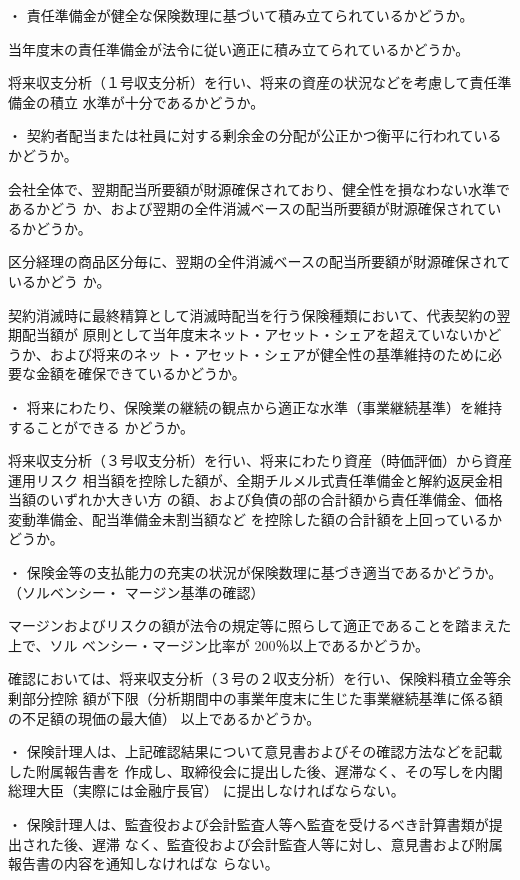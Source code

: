 \documentclass[report,gutter=10mm,fore-edge=10mm,uplatex,dvipdfmx]{jlreq}
\begin{document}
・ 責任準備金が健全な保険数理に基づいて積み立てられているかどうか。

当年度末の責任準備金が法令に従い適正に積み立てられているかどうか。

将来収支分析（１号収支分析）を行い、将来の資産の状況などを考慮して責任準備金の積立
水準が十分であるかどうか。

・ 契約者配当または社員に対する剰余金の分配が公正かつ衡平に行われているかどうか。

会社全体で、翌期配当所要額が財源確保されており、健全性を損なわない水準であるかどう
か、および翌期の全件消滅ベースの配当所要額が財源確保されているかどうか。

区分経理の商品区分毎に、翌期の全件消滅ベースの配当所要額が財源確保されているかどう
か。

契約消滅時に最終精算として消滅時配当を行う保険種類において、代表契約の翌期配当額が
原則として当年度末ネット・アセット・シェアを超えていないかどうか、および将来のネッ
ト・アセット・シェアが健全性の基準維持のために必要な金額を確保できているかどうか。

・ 将来にわたり、保険業の継続の観点から適正な水準（事業継続基準）を維持することができる
かどうか。

将来収支分析（３号収支分析）を行い、将来にわたり資産（時価評価）から資産運用リスク
相当額を控除した額が、全期チルメル式責任準備金と解約返戻金相当額のいずれか大きい方
の額、および負債の部の合計額から責任準備金、価格変動準備金、配当準備金未割当額など
を控除した額の合計額を上回っているかどうか。

・ 保険金等の支払能力の充実の状況が保険数理に基づき適当であるかどうか。（ソルベンシー・
マージン基準の確認）

マージンおよびリスクの額が法令の規定等に照らして適正であることを踏まえた上で、ソル
ベンシー・マージン比率が 200％以上であるかどうか。

確認においては、将来収支分析（３号の２収支分析）を行い、保険料積立金等余剰部分控除
額が下限（分析期間中の事業年度末に生じた事業継続基準に係る額の不足額の現価の最大値）
以上であるかどうか。

・ 保険計理人は、上記確認結果について意見書およびその確認方法などを記載した附属報告書を
作成し、取締役会に提出した後、遅滞なく、その写しを内閣総理大臣（実際には金融庁長官）
に提出しなければならない。

・ 保険計理人は、監査役および会計監査人等へ監査を受けるべき計算書類が提出された後、遅滞
なく、監査役および会計監査人等に対し、意見書および附属報告書の内容を通知しなければな
らない。
\end{document}
